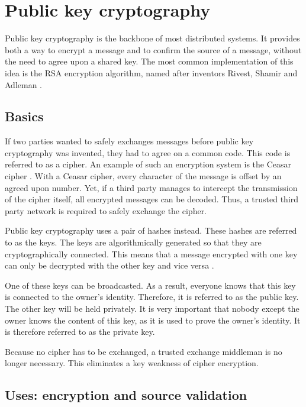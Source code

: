 \section{Public key cryptography}

Public key cryptography is the backbone of most distributed systems. It provides both a way to encrypt a message and to confirm the source of a message, without the need to agree upon a shared key. The most common implementation of this idea is the RSA encryption algorithm, named after inventors Rivest, Shamir and Adleman \cite{rsa-patent}. 

\subsection{Basics}

If two parties wanted to safely exchanges messages before public key cryptography was invented, they had to agree on a common code. This code is referred to as a cipher. An example of such an encryption system is the Ceasar cipher \cite{ceasar-cypher}. With a Ceasar cipher, every character of the message is offset by an agreed upon number. Yet, if a third party manages to intercept the transmission of the cipher itself, all encrypted messages can be decoded. Thus, a trusted third party network is required to safely exchange the cipher.

Public key cryptography uses a pair of hashes instead. These hashes are referred to as the keys. The keys are algorithmically generated so that they are cryptographically connected. This means that a message encrypted with one key can only be decrypted with the other key and vice versa \cite{rsa-paper-explanation}.

One of these keys can be broadcasted. As a result, everyone knows that this key is connected to the owner's identity. Therefore, it is referred to as the public key. The other key will be held privately. It is very important that nobody except the owner knows the content of this key, as it is used to prove the owner's identity. It is therefore referred to as the private key.

Because no cipher has to be exchanged, a trusted exchange middleman is no longer necessary. This eliminates a key weakness of cipher encryption.

\subsection{Uses: encryption and source validation}

